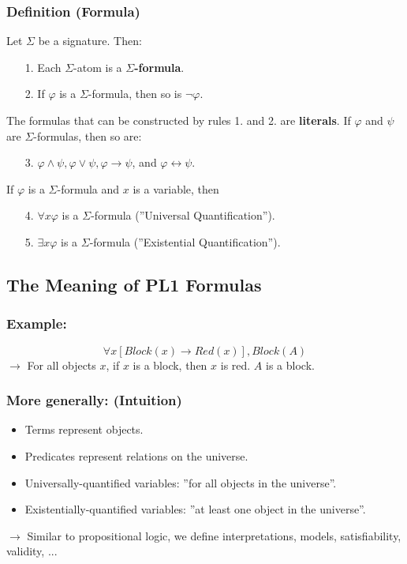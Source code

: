\documentclass[conference, a4paper]{styles/acmsiggraph}
\begin{document}
        \subsubsection{Definition (Formula)}
            Let $\Sigma$ be a signature. Then:
            \begin{enumerate}
                \item[1.] Each $\Sigma$-atom is a \textbf{$\Sigma$-formula}.
                \item[2.] If $\varphi$ is a $\Sigma$-formula, then so is $\lnot \varphi$.
            \end{enumerate}
            The formulas that can be constructed by rules 1. and 2. are \textbf{literals}.\newline
            If $\varphi$ and $\psi$ are $\Sigma$-formulas, then so are:
            \begin{enumerate}
                \item[3.] $\varphi \wedge \psi, \varphi \vee \psi, \varphi \rightarrow \psi$, and $\varphi \leftrightarrow \psi$.
            \end{enumerate}
            If $\varphi$ is a $\Sigma$-formula and $x$ is a variable, then
            \begin{enumerate}
                \item[4.] $\forall x \varphi$ is a $\Sigma$-formula (''Universal Quantification'').
                \item[5.] $\exists x \varphi$ is a $\Sigma$-formula (''Existential Quantification'').
            \end{enumerate}
        
    \subsection{The Meaning of PL1 Formulas}
        \subsubsection{Example:}
            $$\forall x [Block(x) \rightarrow Red(x)], Block(A)$$
            $\rightarrow$ For all objects $x$, if $x$ is a block, then $x$ is red. $A$ is a block.
        
        \subsubsection{More generally: (Intuition)}
            \begin{itemize}
                \item Terms represent objects.
                \item Predicates represent relations on the universe.
                \item Universally-quantified variables: ''for all objects in the universe''.
                \item Existentially-quantified variables: ''at least one object in the universe''.
            \end{itemize}
            $\rightarrow$ Similar to propositional logic, we define interpretations, models, satisfiability, validity, ...
    
\end{document}
